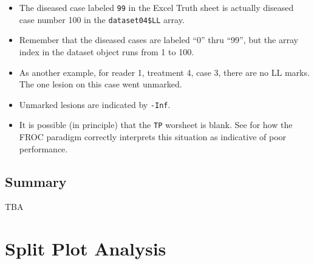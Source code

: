 \documentclass[]{book}
\newenvironment{Shaded}{\begin{snugshade}}{\end{snugshade}}
\newcommand{\CommentTok}[1]{\textcolor[rgb]{0.56,0.35,0.01}{\textit{#1}}}
\newcommand{\DecValTok}[1]{\textcolor[rgb]{0.00,0.00,0.81}{#1}}
\newcommand{\NormalTok}[1]{#1}
\newcommand{\OperatorTok}[1]{\textcolor[rgb]{0.81,0.36,0.00}{\textbf{#1}}}
\providecommand{\tightlist}{%
  \setlength{\itemsep}{0pt}\setlength{\parskip}{0pt}}
\begin{document}
\begin{Shaded}
\end{Shaded}

\begin{itemize}
\tightlist
\item
  The diseased case labeled \texttt{99} in the Excel Truth sheet is actually diseased case number 100 in the \texttt{dataset04\$LL} array.
\item
  Remember that the diseased cases are labeled ``0'' thru ``99'', but the array index in the dataset object runs from 1 to 100.
\item
  As another example, for reader 1, treatment 4, case 3, there are no LL marks. The one lesion on this case went unmarked.
\end{itemize}

\begin{Shaded}
\end{Shaded}

\begin{itemize}
\tightlist
\item
  Unmarked lesions are indicated by \texttt{-Inf}.
\item
  It is possible (in principle) that the \texttt{TP} worsheet is blank. See \citep{RN2680} for how the FROC paradigm correctly interprets this situation as indicative of poor performance.
\end{itemize}

\hypertarget{summary-1}{%
\section{Summary}\label{summary-1}}

TBA

\hypertarget{split-plot-analysis}{%
\chapter{Split Plot Analysis}\label{split-plot-analysis}}
\end{document}
